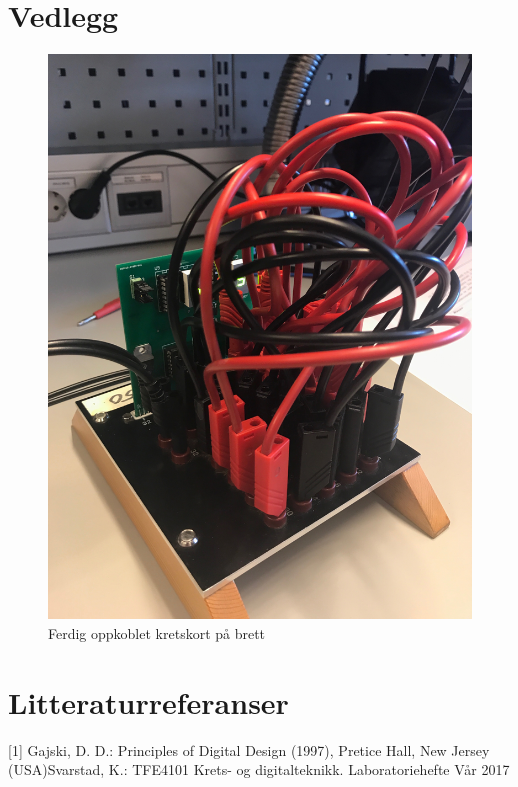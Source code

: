 \documentclass{article}
\begin{document}
\section{Vedlegg}
\begin{figure}[H]
	\centering
	\includegraphics[width=1\linewidth]{IMG_2923}
	\caption{Ferdig oppkoblet kretskort på brett}
	\label{fig:IMG_2923}
\end{figure}

\section{Litteraturreferanser}
[1] Gajski, D. D.: Principles of Digital Design (1997), Pretice Hall, New Jersey (USA)\newline
[2] Svarstad, K.: TFE4101 Krets- og digitalteknikk. Laboratoriehefte Vår 2017
\end{document}
